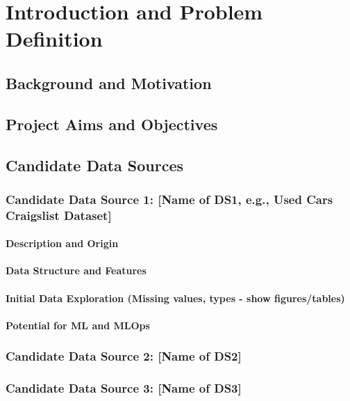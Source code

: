 \chapter{Introduction and Problem Definition}
    \section{Background and Motivation}
    \section{Project Aims and Objectives}
    \section{Candidate Data Sources}
        \subsection{Candidate Data Source 1: [Name of DS1, e.g., Used Cars Craigslist Dataset]}
            \subsubsection{Description and Origin}
            \subsubsection{Data Structure and Features}
            \subsubsection{Initial Data Exploration (Missing values, types - show figures/tables)}
            \subsubsection{Potential for ML and MLOps}
        \subsection{Candidate Data Source 2: [Name of DS2]}
        \subsection{Candidate Data Source 3: [Name of DS3]}
